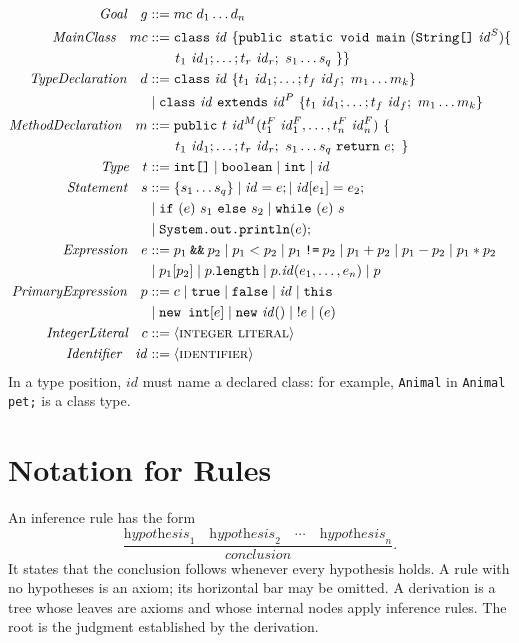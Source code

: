 \documentclass[11pt,a4paper]{article}
\newcommand{\kw}[1]{\text{\texttt{#1}}}
\newcommand{\id}{\mathit{id}}
\begin{document}
\begingroup\small
\begin{align*}
\textit{Goal}\quad g &::= mc\ d_1\ldots d_n\\
\textit{MainClass}\quad mc &::= \kw{class}\ \id\ \{\kw{public\ static\ void\ main}\ (\kw{String[]}\ \id^S)\{\\
 &\qquad t_1\ \id_1;\ldots;t_r\ \id_r;\ s_1\ldots s_q\ \}\}\!\\
\textit{TypeDeclaration}\quad d &::= \kw{class}\ \id\ \{t_1\ \id_1;\ldots;t_f\ \id_f;\ m_1\ldots m_k\}\\
 &\mid \kw{class}\ \id\ \kw{extends}\ \id^P\ \{t_1\ \id_1;\ldots;t_f\ \id_f;\ m_1\ldots m_k\}\\
\textit{MethodDeclaration}\quad m &::= \kw{public}\ t\ \id^M(t_1^F\ \id_1^F,\ldots,t_n^F\ \id_n^F)\ \{\\
 &\qquad t_1\ \id_1;\ldots;t_r\ \id_r;\ s_1\ldots s_q\ \kw{return}\ e;\ \}\\
\textit{Type}\quad t &::= \kw{int[]}\mid\kw{boolean}\mid\kw{int}\mid\id\\
\textit{Statement}\quad s &::= \{s_1\ldots s_q\}\mid\id=e;\mid\id[e_1]=e_2;\\
 &\mid\kw{if}\ (e)\ s_1\ \kw{else}\ s_2\mid\kw{while}\ (e)\ s\\
 &\mid\kw{System.out.println}(e);\\
\textit{Expression}\quad e &::= p_1\mathbin{\kw{\&\&}}p_2\mid p_1<p_2\mid p_1\mathbin{\kw{!=}} p_2\mid p_1+p_2\mid p_1-p_2\mid p_1*p_2\\
 &\mid p_1[p_2]\mid p.\kw{length}\mid p.\id(e_1,\ldots,e_n)\mid p\\
\textit{PrimaryExpression}\quad p &::= c\mid\kw{true}\mid\kw{false}\mid\id\mid\kw{this}\\
 &\mid\kw{new\ int}[e]\mid\kw{new}\ \id()\mid {!e}\mid(e)\\
\textit{IntegerLiteral}\quad c &::= \langle\textsc{integer literal}\rangle\\
\textit{Identifier}\quad\id &::= \langle\textsc{identifier}\rangle
\end{align*}
\endgroup
In a type position, $\id$ must name a declared class: for example,
\texttt{Animal} in \texttt{Animal pet;} is a class type.

\newpage
\section{Notation for Rules}
An inference rule has the form
\[
\frac{\textit{hypothesis}_1\quad\textit{hypothesis}_2\quad\cdots\quad\textit{hypothesis}_n}
{\textit{conclusion}}.
\]
It states that the conclusion follows whenever every hypothesis holds. A rule
with no hypotheses is an axiom; its horizontal bar may be omitted. A derivation
is a tree whose leaves are axioms and whose internal nodes apply inference rules.
The root is the judgment established by the derivation.
\end{document}
